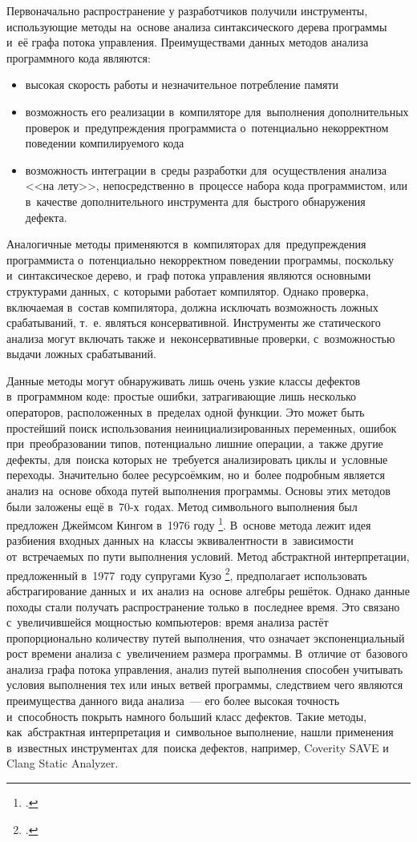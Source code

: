 Первоначально распространение у разработчиков получили инструменты, использующие методы на~основе анализа синтаксического дерева программы и~её графа потока управления. Преимуществами данных методов анализа программного кода являются:

\begin{itemize}
 \item высокая скорость работы и незначительное потребление памяти
 \item возможность его реализации в~компиляторе для~выполнения дополнительных проверок и~предупреждения программиста о~потенциально некорректном поведении компилируемого кода
 \item возможность интеграции в~среды разработки для~осуществления анализа <<на лету>>, непосредственно в~процессе набора кода программистом, или в~качестве дополнительного инструмента для~быстрого обнаружения дефекта.
\end{itemize}

Аналогичные методы применяются в~компиляторах для~предупреждения программиста о~потенциально некорректном поведении программы, поскольку и~синтаксическое дерево, и~граф потока управления являются основными структурами данных, с~которыми работает компилятор. Однако проверка, включаемая в~состав компилятора, должна исключать возможность ложных срабатываний, т.~е. являться консервативной. Инструменты же статического анализа могут включать также и~неконсервативные проверки, с~возможностью выдачи ложных срабатываний.

Данные методы могут обнаруживать лишь очень узкие классы дефектов в~программном коде: простые ошибки, затрагивающие лишь несколько операторов, расположенных в~пределах одной функции. Это может быть простейший поиск использования неинициализированных переменных, ошибок при~преобразовании типов, потенциально лишние операции, а~также другие дефекты, для~поиска которых не~требуется анализировать циклы и~условные переходы. Значительно более ресурсоёмким, но и~более подробным является анализ на~основе обхода путей выполнения программы. Основы этих методов были заложены ещё в~70-х~годах. Метод символьного выполнения был предложен Джеймсом Кингом в~1976 году \footcite{king76}. В~основе метода лежит идея разбиения входных данных на~классы эквивалентности в~зависимости от~встречаемых по пути выполнения условий. Метод абстрактной интерпретации, предложенный в~1977~году супругами Кузо \footcite{cousot}, предполагает использовать абстрагирование данных и~их анализ на~основе алгебры решёток. Однако данные походы стали получать распространение только в~последнее время. Это связано с~увеличившейся мощностью компьютеров: время анализа растёт пропорционально количеству путей выполнения, что означает экспоненциальный рост времени анализа с~увеличением размера программы. В~отличие от~базового анализа графа потока управления, анализ путей выполнения способен учитывать условия выполнения тех или иных ветвей программы,  следствием чего являются преимущества данного вида анализа~--- его более высокая точность и~способность покрыть намного больший класс дефектов. Такие методы, как~абстрактная интерпретация и~символьное выполнение, нашли применения в~известных инструментах для~поиска дефектов, например, Coverity SAVE и Clang Static Analyzer.

